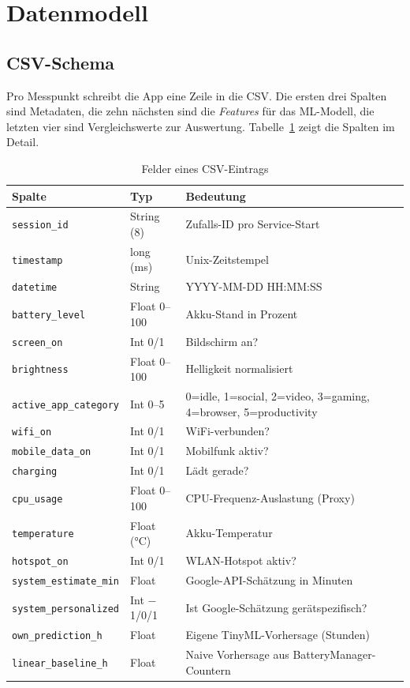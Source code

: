 \documentclass[12pt, a4paper, ngerman]{article}
\newcommand{\code}[1]{\texttt{#1}}
\begin{document}
\newpage

\section{Datenmodell}
\label{sec:datenmodell}

\subsection{CSV-Schema}

Pro Messpunkt schreibt die App eine Zeile in die CSV. Die ersten
drei Spalten sind Metadaten, die zehn nächsten sind die
\emph{Features} für das ML-Modell, die letzten vier sind
Vergleichswerte zur Auswertung. Tabelle~\ref{tab:csv_schema} zeigt
die Spalten im Detail.

\begin{table}[H]
\centering
\caption{Felder eines CSV-Eintrags}
\label{tab:csv_schema}
\small
\begin{tabular}{lll}
\toprule
\textbf{Spalte} & \textbf{Typ} & \textbf{Bedeutung} \\
\midrule
\code{session\_id}         & String (8) & Zufalls-ID pro Service-Start \\
\code{timestamp}           & long (ms)  & Unix-Zeitstempel \\
\code{datetime}            & String     & YYYY-MM-DD HH:MM:SS \\
\midrule
\code{battery\_level}      & Float 0--100 & Akku-Stand in Prozent \\
\code{screen\_on}          & Int 0/1      & Bildschirm an? \\
\code{brightness}          & Float 0--100 & Helligkeit normalisiert \\
\code{active\_app\_category}& Int 0--5    & 0=idle, 1=social, 2=video, 3=gaming, 4=browser, 5=productivity \\
\code{wifi\_on}            & Int 0/1      & WiFi-verbunden? \\
\code{mobile\_data\_on}    & Int 0/1      & Mobilfunk aktiv? \\
\code{charging}            & Int 0/1      & Lädt gerade? \\
\code{cpu\_usage}          & Float 0--100 & CPU-Frequenz-Auslastung (Proxy) \\
\code{temperature}         & Float (°C)   & Akku-Temperatur \\
\code{hotspot\_on}         & Int 0/1      & WLAN-Hotspot aktiv? \\
\midrule
\code{system\_estimate\_min}& Float       & Google-API-Schätzung in Minuten \\
\code{system\_personalized}& Int $-$1/0/1 & Ist Google-Schätzung gerätspezifisch? \\
\code{own\_prediction\_h}  & Float        & Eigene TinyML-Vorhersage (Stunden) \\
\code{linear\_baseline\_h} & Float        & Naive Vorhersage aus BatteryManager-Countern \\
\bottomrule
\end{tabular}
\end{table}
\end{document}
